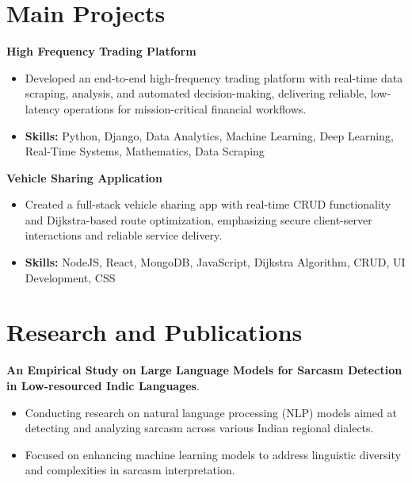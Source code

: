 \documentclass[a4paper,11pt]{article}
\begin{document}
\section{\textbf{Main Projects}}

\vspace{1mm}
  \textbf{High Frequency Trading Platform  }
\vspace{-1.5mm} %
\begin{itemize}
  \item Developed an end-to-end high-frequency trading platform with real-time data scraping, analysis, and automated decision-making, delivering reliable, low-latency operations for mission-critical financial workflows.
\vspace{-3mm}
  \item \textbf{Skills:} Python, Django, Data Analytics, Machine Learning, Deep Learning, Real-Time Systems, Mathematics, Data Scraping
\end{itemize}


\vspace{1mm}
   \textbf{Vehicle Sharing Application }
\vspace{-1.5mm} %
\begin{itemize}
  \item Created a full-stack vehicle sharing app with real-time CRUD functionality and Dijkstra-based route optimization, emphasizing secure client-server interactions and reliable service delivery.
\vspace{-3mm}
  \item \textbf{Skills:} NodeJS, React, MongoDB, JavaScript, Dijkstra Algorithm, CRUD, UI Development, CSS
\end{itemize}



\section{\textbf{Research and Publications} \hfill }
\vspace{1mm}
  \textbf{An Empirical Study on Large Language Models for Sarcasm Detection in Low-resourced Indic Languages}.
\vspace{-1mm} %
\begin{itemize}
  \item Conducting research on natural language processing (NLP) models aimed at detecting and analyzing sarcasm across various Indian regional dialects.
\vspace{-3mm}
  \item Focused on enhancing machine learning models to address linguistic diversity and complexities in sarcasm interpretation.
\end{itemize}
\end{document}
